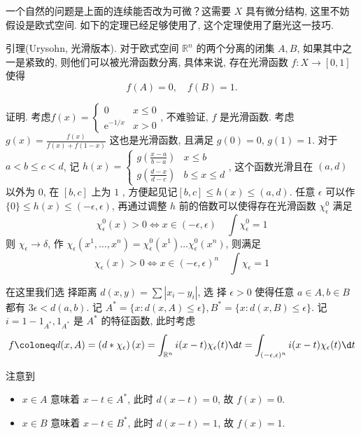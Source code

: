 \documentclass[options]{article}
\begin{document}
\begin{remark}
	一个自然的问题是上面的连续能否改为可微？这需要 $X$ 具有微分结构, 这里不妨假设是欧式空间. 如下的定理已经足够使用了, 这个定理使用了磨光这一技巧.

	\hrulefill

	引理(Urysohn, 光滑版本). 对于欧式空间 $\mathbb{R}^n$ 的两个分离的闭集 $A, B$, 如果其中之一是紧致的, 则他们可以被光滑函数分离, 具体来说, 存在光滑函数 $f: X \rightarrow[0,1]$ 使得
	\[
			f(A)=0, \quad f(B)=1.
	\]
\end{remark}
证明. 考虑\linespread{0.5}\selectfont$f(x)=
\begin{cases}
	0                   & x \leq 0 \\
	\mathrm{e}^{-1 / x} & x>0
\end{cases}
$\linespread{1.3}\selectfont, 不难验证, $f$ 是光滑函数. 考虑 $g(x)=\frac{f(x)}{f(x)+f(1-x)}$ 这也是光滑函数, 且满足 $g(0)=0$, $g(1)=1$. 对于 $a<b \leq c<d$, 记 $h(x)=\left\{
\begin{array}{ll}g\left(\frac{x-a}{b-a}\right) & x \leq b \\ g\left(\frac{d-x}{d-c}\right) & b \leq x \leq d\end{array}
\right.$, 这个函数光滑且在 $(a, d)$ 以外为 $0$, 在 $[b, c]$ 上为 $1$ , 方便起见记$[b, c] \leq h(x) \leq(a, d)$. 任意 $\epsilon$ 可以作 $\{0\} \leq h(x) \leq(-\epsilon, \epsilon)$, 再通过调整 $h$ 前的倍数可以使得存在光滑函数 $\chi_\epsilon^0$ 满足
\[
		\chi_\epsilon^0(x)>0 \Longleftrightarrow x \in(-\epsilon, \epsilon) \quad \int \chi_\epsilon^0=1
\]
则 $\chi_{\epsilon}\to \delta$, 作 $\chi_\epsilon\left(x^1, \ldots, x^n\right)=\chi_\epsilon^0(x^1) \ldots \chi_\epsilon^0(x^n)$, 则满足
\[
		\chi_\epsilon(x)>0 \Longleftrightarrow x \in(-\epsilon, \epsilon)^n \quad \int \chi_\epsilon=1
\]

在这里我们选 择距离 $d(x, y)=\sum\left|x_i-y_i\right|$, 选 择 $\epsilon>0$ 使得任意 $a \in A, b \in B$ 都有 $3 \epsilon<d(a, b)$. 记 $A^*=\{x: d(x, A) \leq \epsilon\}, B^*=\{x: d(x, B) \leq \epsilon\}$. 记 $i=1-1_{A^*}, 1_{A^*}$ 是 $A^*$ 的特征函数, 此时考虑
\[
		f\coloneq d(x, A)=\left(d * \chi_\epsilon\right)(x)=\int_{\mathbb{R}^n} i(x-t) \chi_\epsilon(t) \d t=\int_{(-\epsilon, \epsilon)^n} i(x-t) \chi_\epsilon(t) \d t
\]

注意到
\begin{itemize}
	\item $x \in A$ 意味着 $x-t \in A^*$, 此时 $d(x-t)=0$, 故 $f(x)=0$.
	\item $x \in B$ 意味着 $x-t \in B^*$, 此时 $d(x-t)=1$, 故 $f(x)=1$.
\end{itemize}
\end{document}

